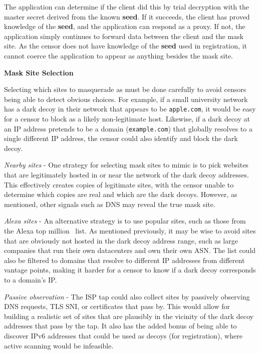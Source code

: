 \documentclass[letterpaper,twocolumn,10pt]{article}
\renewcommand{\paragraph}[1]{\smallskip\noindent\textbf{#1\quad}}
\begin{document}
The application can determine if the client did this by trial decryption with
the master secret derived from the known \textbf{seed}. If it succeeds, the
client has proved knowledge of the \textbf{seed}, and the application can
respond as a proxy. If not, the application simply continues to forward data
between the client and the mask site. As the censor does not have knowledge of
the \textbf{seed} used in registration, it cannot coerce the application to
appear as anything besides the mask site.


\paragraph{Mask Site Selection}

Selecting which sites to masquerade as must be done carefully to avoid censors
being able to detect obvious choices. For example, if a small university network
has a dark decoy in their network that appears to be \texttt{apple.com}, it
would be easy for a censor to block as a likely non-legitimate host. Likewise,
if a dark decoy at an IP address pretends to be a domain (\texttt{example.com}) that
globally resolves to a single different IP address, the censor could also
identify and block the dark decoy.

\smallskip
\noindent
\emph{Nearby sites} - One strategy for selecting mask sites to mimic is to pick websites that are
legitimately hosted in or near the network of the dark decoy addresses. This
effectively creates copies of legitimate sites, with the censor unable to
determine which copies are real and which are the dark decoys. However, as
mentioned, other signals such as DNS may reveal the true mask site.

\smallskip
\noindent
\emph{Alexa sites} -
An alternative strategy is to use popular sites, such as those from the Alexa
top million~\cite{alexa} list. As mentioned previously, it may be wise to avoid
sites that are obviously not hosted in the dark decoy address range, such as
large companies that run their own datacenters and own their own ASN.
The list could also be filtered to domains that resolve to different IP
addresses from different vantage points, making it harder for a censor to know
if a dark decoy corresponds to a domain's IP.

\smallskip
\noindent
\emph{Passive observation} -
The ISP tap could also collect sites by passively observing DNS requests, TLS
SNI, or certificates that pass by. This would allow for building a realistic set
of sites that are plausibly in the vicinity of the dark decoy addresses
that pass by the tap. It also has the added bonus of being able to discover
IPv6 addresses that could be used as decoys (for registration), where active
scanning would be infeasible.
\end{document}
